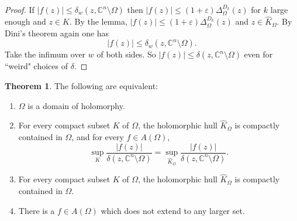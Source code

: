 \documentclass[12pt]{report}
\newcommand{\CC}{\mathbb{C}}
\theoremstyle{definition}
\newtheorem{theorem}{Theorem}[chapter]
\begin{document}
\begin{proof}
    If $|f(z)| \leq \delta_w(z, \CC^n \setminus \Omega)$ then $|f(z)| \leq (1 + \varepsilon) \Delta^{D_k}_\Omega(z)$ for $k$ large enough and $z \in K$. By the lemma, $|f(z)| \leq (1 + \varepsilon)\Delta_\Omega^{D_k}(z)$ and $z \in \hat K_\Omega$. By Dini's theorem again one has
    $$|f(z)| \leq \delta_w(z, \CC^n \setminus \Omega).$$
    Take the infimum over $w$ of both sides. So $|f(z)| \leq \delta(z, \CC^n \setminus \Omega)$ even for ``weird" choices of $\delta$. 
\end{proof}


\begin{theorem}
The following are equivalent:
\begin{enumerate}
    \item $\Omega$ is a domain of holomorphy.
    \item For every compact subset $K$ of $\Omega$, the holomorphic hull $\hat K_\Omega$ is compactly contained in $\Omega$, and for every $f \in A(\Omega)$,
    $$\sup_K \frac{|f(z)|}{\delta(z, \CC^n \setminus \Omega)} = \sup_{\hat K_\Omega} \frac{|f(z)|}{\delta(z, \CC^n \setminus \Omega)}.$$
    \item For every compact subset $K$ of $\Omega$, the holomorphic hull $\hat K_\Omega$ is compactly contained in $\Omega$.
    \item There is a $f \in A(\Omega)$ which does not extend to any larger set.
\end{enumerate}
\end{theorem}
\end{document}
